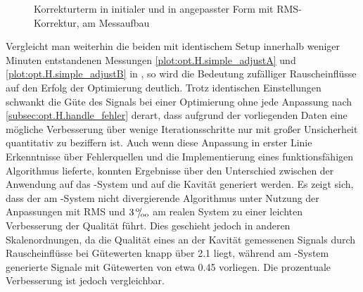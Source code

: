 \documentclass[../Report.tex]{subfiles}
\begin{document}
\begin{figure}[htb]

\caption{Korrekturterm in initialer und in angepasster Form mit RMS- Korrektur, am Messaufbau}
\label{fig:opt.H.RMS_fabs}

\end{figure}

Vergleicht man weiterhin die beiden mit identischem Setup innerhalb weniger Minuten entstandenen Messungen \ref{plot:opt.H.simple_adjustA} und \ref{plot:opt.H.simple_adjustB} in , so wird die Bedeutung zufälliger Rauscheinflüsse auf den Erfolg der Optimierung deutlich. Trotz identischen Einstellungen schwankt die Güte des Signals bei einer Optimierung ohne jede Anpassung nach \ref{subsec:opt.H.handle_fehler} derart, dass aufgrund der vorliegenden Daten eine mögliche Verbesserung über wenige Iterationsschritte nur mit großer Unsicherheit quantitativ zu beziffern ist.
Auch wenn diese Anpassung in erster Linie Erkenntnisse über Fehlerquellen und die Implementierung eines funktionsfähigen Algorithmus lieferte, konnten Ergebnisse über den Unterschied zwischen der Anwendung auf das \mock-System und auf die Kavität generiert werden. Es zeigt sich, dass der am \mock-System nicht divergierende Algorithmus unter Nutzung der Anpassungen mit RMS und $3 \, {}^\text{o}\mkern-5mu/\mkern-3mu_\text{oo}$ am realen System zu einer leichten Verbesserung der Qualität führt. Dies geschieht jedoch in anderen Skalenordnungen, da die Qualität eines an der Kavität gemessenen Signals durch Rauscheinflüsse bei Gütewerten knapp über 2.1 liegt, während am \mock-System generierte Signale mit Gütewerten von etwa 0.45 vorliegen. Die prozentuale Verbesserung ist jedoch vergleichbar.
\end{document}
